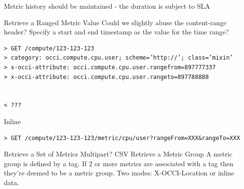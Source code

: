 \documentclass[12pt]{article}  %
\begin{document}
{Metric history should be maintained - the duration is subject to SLA


Retrieve a Ranged Metric Value
Could we slightly abuse the content-range header? Specify a start and end timestamp as the value for the time range?
\begin{verbatim}
> GET /compute/123-123-123
> category: occi.compute.cpu.user; scheme=’http://’; class=’mixin’
> x-occi-attribute: occi.compute.cpu.user.rangefrom=897777337
> x-occi-attribute: occi.compute.cpu.user.rangeto=897788888


< ???
\end{verbatim}

Inline
\begin{verbatim}
> GET /compute/123-123-123/metric/cpu/user?rangeFrom=XXX&rangeTo=XXX
\end{verbatim}
Retrieve a Set of Metrics
Multipart? CSV
Retrieve a Metric Group
A metric group is defined by a tag. If 2 or more metrics are associated with a tag then they’re deemed to be a metric group. Two modes: X-OCCI-Location or inline data.
}
\end{document}
